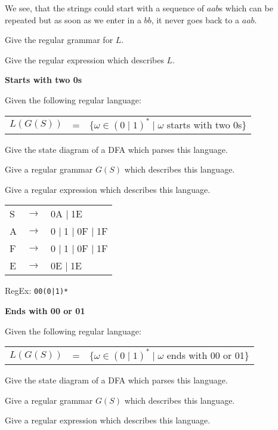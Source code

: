 \documentclass[a4paper]{exam}
\theoremstyle{remark}
\newenvironment{grammar}
	{\begin{tabular}[b]{lcl}}
	{\end{tabular}}
\newcommand{\rewritten}{$\to$}
\newcommand{\alternative}{$\mid \;$}
\begin{document}
\begin{questions}
\begin{parts}
\begin{solution}
			We see, that the strings could start with a sequence of $aab$s which can be repeated but as soon as we enter in a $bb$, it never goes back to a $aab$.
		\end{solution}
		\item Give the regular grammar for $L$.
		\item Give the regular expression which describes $L$.
	\end{parts}

\question
	\textbf{Starts with two 0s}

	Given the following regular language:
	
	\begin{tabular}[b]{lcl}
		$L(G(S))$ & = & $\{\omega \in (0 \mid 1)^* \mid \omega$ starts with two 0s\}
	\end{tabular}

	\begin{parts}
		\item Give the state diagram of a DFA which parses this language.
		\item Give a regular grammar $G(S)$ which describes this language.
		\item Give a regular expression which describes this language.
	\end{parts}

	\begin{solution}
		
		\begin{grammar}
			S &\rewritten & 0A \alternative 1E \\
			A &\rewritten & 0 \alternative 1 \alternative 0F \alternative 1F \\
			F &\rewritten & 0 \alternative 1 \alternative 0F \alternative 1F \\
			E &\rewritten & 0E \alternative 1E
		\end{grammar}
		
		RegEx: {\tt 00(0|1)*}
		
	\end{solution}
	
\question
	\textbf{Ends with 00 or 01}

	Given the following regular language:
	\begin{tabular}[b]{lcl}
		$L(G(S))$ & = & $\{\omega \in (0 \mid 1)^* \mid \omega$ ends with 00 or 01\}
	\end{tabular}

	\begin{parts}
		\item Give the state diagram of a DFA which parses this language.
		\item Give a regular grammar $G(S)$ which describes this language.
		\item Give a regular expression which describes this language.
	\end{parts}
	

\end{questions}
\end{document}
